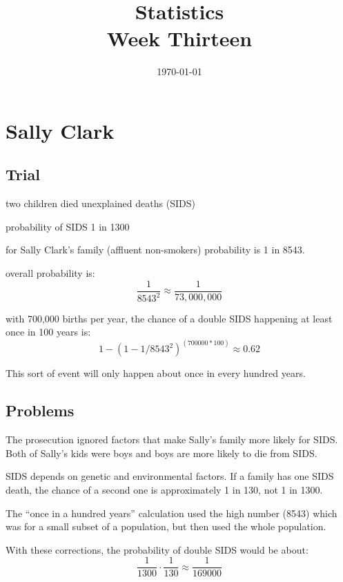 \documentclass[landscape]{exam}
\title{Statistics \\ Week Thirteen}
\date{\today}
\author{}
\begin{document}
  \maketitle
  \tableofcontents

  \section{Sally Clark}

  \subsection{Trial}
  \begin{itemize*}
    \item two children died unexplained deaths (SIDS)
    \item probability of SIDS 1 in 1300
    \item for Sally Clark's family (affluent non-smokers) probability is 1 in
      8543.
    \item overall probability is:
      \[
        \frac{1}{8543^2} \approx \frac{1}{73,000,000}
      \]

    \item with 700,000 births per year, the chance of a double SIDS happening at
      least once in 100 years is:
      \[
        1 - (1 - 1/8543^2)^(700000 * 100) \approx 0.62
      \]

      This sort of event will only happen about once in every hundred years.
  \end{itemize*}

  \subsection{Problems}

  The prosecution ignored factors that make Sally's family more likely for
  SIDS. Both of Sally's kids were boys and boys are more likely to die from
  SIDS.

  SIDS depends on genetic and environmental factors. If a family has one SIDS
  death, the chance of a second one is approximately 1 in 130, not 1 in 1300.

  The ``once in a hundred years'' calculation used the high number (8543)
  which was for a small subset of a population, but then used the whole
  population.

  With these corrections, the probability of double SIDS would be about:
  \[
    \frac{1}{1300} \cdot \frac{1}{130} \approx \frac{1}{169000} 
  \]
\end{document}
